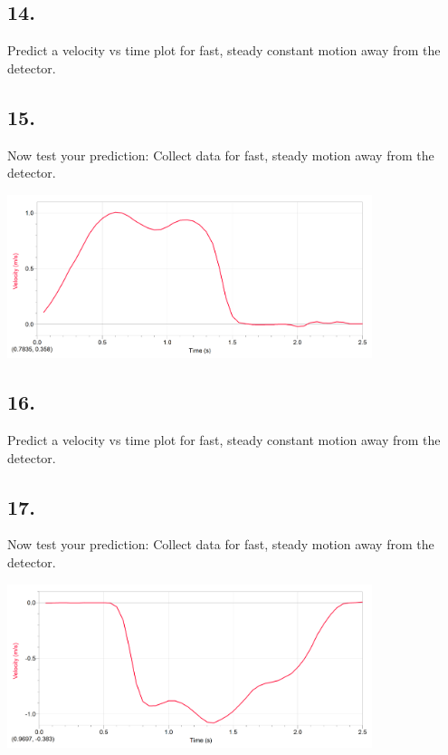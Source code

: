     \subsection*{14.}
    Predict a velocity vs time plot for fast, steady constant motion away from the detector. 

    \begin{mdframed}
        
    \end{mdframed}

    \subsection*{15.}
    Now test your prediction: Collect data for fast, steady motion away from the detector.

    \begin{mdframed}
        \centering\includegraphics[width=0.8\textwidth]{image12.png}
    \end{mdframed}

    \subsection*{16.}
    Predict a velocity vs time plot for fast, steady constant motion away from the detector. 

    \begin{mdframed}
        
    \end{mdframed}

    \subsection*{17.}
    Now test your prediction: Collect data for fast, steady motion away from the detector.

    \begin{mdframed}
        \centering\includegraphics[width=0.8\textwidth]{image21.png}
    \end{mdframed}

